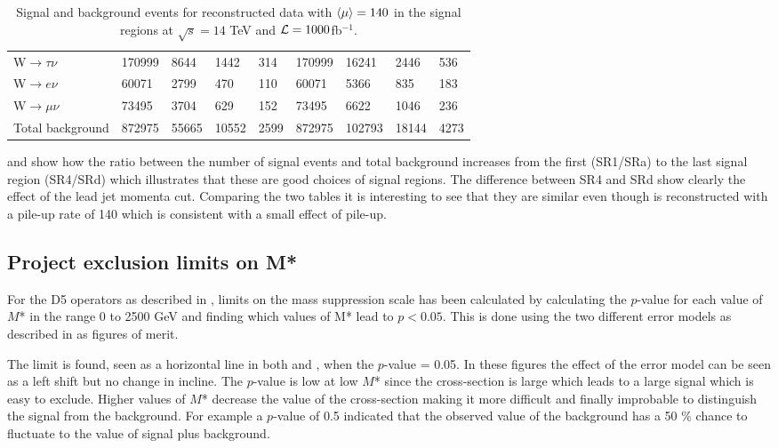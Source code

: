 \begin{landscape}
\begin{table}[ht]
\begin{center}
\begin{tabular}{|l|l|l|l|l !{\vrule width 4pt} l|l|l|l|}
W$\rightarrow\tau\nu$ & 170999 & 8644 & 1442 & 314 & 170999 & 16241 & 2446 & 536 \\
W$\rightarrow e\nu$ & 60071 & 2799 & 470 & 110 & 60071 & 5366 & 835 & 183 \\
W$\rightarrow\mu\nu$ & 73495 & 3704 & 629 & 152 & 73495 & 6622 & 1046 & 236 \\ \hline
Total background & 872975 & 55665 & 10552 & 2599 & 872975 & 102793 & 18144 & 4273 \\ \hline 
\end{tabular}
\caption{Signal and background events for reconstructed data with $\left<\mu\right>=140$ in the signal regions at $\sqrt{s}=14$ TeV and $\mathcal{L}=1000$fb$^{-1}$.}
\label{tab:srreco1}
\end{center}
\end{table}
\end{landscape}

 and  show how the ratio between the number of signal events and total background increases from the first (SR1/SRa) to the last signal region (SR4/SRd) which illustrates that these are good choices of signal regions. The difference between SR4 and SRd show clearly the effect of the lead jet momenta cut. Comparing the two tables it is interesting to see that they are similar even though  is reconstructed with a pile-up rate of 140 which is consistent with a small effect of pile-up.
\subsection{Project exclusion limits on M*}\label{sec:res:subsec:m*}
For the D5 operators as described in , limits on the mass suppression scale has been calculated by calculating the $p$-value for each value of $M$* in the range 0 to 2500 GeV and finding which values of M* lead to $p<0.05$. This is done using the two different error models as described in  as figures of merit.

The limit is found, seen as a horizontal line in both  and , when the $p$-value = 0.05. In these figures the effect of the error model can be seen as a left shift but no change in incline. The $p$-value is low at low $M$* since the cross-section is large which leads to a large signal which is easy to exclude. Higher values of $M$* decrease the value of the cross-section making it more difficult and finally improbable to distinguish the signal from the background. For example a $p$-value of 0.5 indicated that the observed value of the background has a 50 \% chance to fluctuate to the value of signal plus background.

